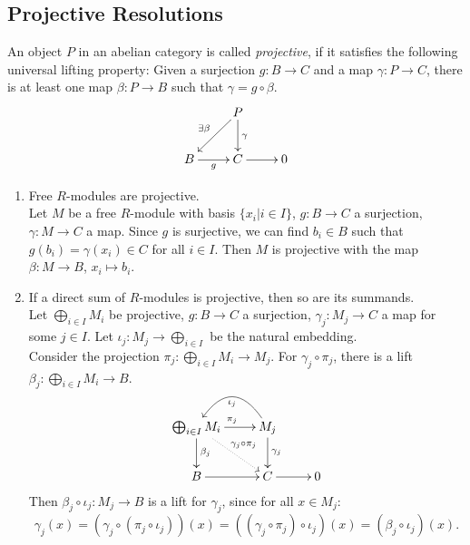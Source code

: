\subsection{Projective Resolutions}

\begin{definition}
	An object $P$ in an abelian category is called \textit{projective}, if it satisfies the following universal lifting property:
	Given a surjection $g:B\rightarrow C$ and a map $\gamma:P\rightarrow C$, there is at least one map $\beta: P\rightarrow B$ such that $\gamma=g\circ\beta$.
	\begin{align*}
		\xymatrix{
			&P \ar[ld]_{\exists\beta} \ar[d]^\gamma \\
			B \ar[r]_g &C \ar[r] &0
		}
	\end{align*}
\end{definition}

\begin{remark}
	\begin{enumerate}[label=(\roman*)]
		\item Free $R$-modules are projective. \\
		Let $M$ be a free $R$-module with basis $\{x_i\vert i\in I\}$, $g:B\rightarrow C$ a surjection, $\gamma:M\rightarrow C$ a map.
		Since $g$ is surjective, we can find $b_i\in B$ such that $g(b_i)=\gamma(x_i)\in C$ for all $i \in I$.
		Then $M$ is projective with the map $\beta:M\rightarrow B$, $x_i\mapsto b_i$.\\
		\item If a direct sum of $R$-modules is projective, then so are its summands.\\
		Let $\bigoplus_{i\in I}M_i$ be projective, $g:B\rightarrow C$ a surjection, $\gamma_j:M_j \rightarrow C$ a map for some $j\in I$.
		Let $\iota_j:M_j\rightarrow \bigoplus_{i\in I}$ be the natural embedding. \\
		Consider the projection $\pi_j:\bigoplus_{i\in I}M_i\rightarrow M_j$. For $\gamma_j\circ\pi_j$, there is a lift $\beta_j:\bigoplus_{i\in I}M_i\rightarrow B$.
		\begin{align*}
			\xymatrix{
				\bigoplus_{i\in I}M_i \ar[r]^{\pi_j} \ar[d]^{\beta_j} \ar@{.>}[rd]^{\gamma_j\circ\pi_j} &M_j \ar[d]^{\gamma_j} \ar@/_2pc/[l]^{\iota_j} \\
				B \ar[r] &C \ar[r] &0
			}
		\end{align*}
		 Then $\beta_j\circ\iota_j: M_j\rightarrow B$ is a lift for $\gamma_j$, since for all $x \in M_j$:
		 $$\gamma_j(x) = (\gamma_j \circ (\pi_j \circ \iota_j))(x) = ((\gamma_j \circ \pi_j) \circ \iota_j)(x) = (\beta_j \circ \iota_j)(x).$$
	\end{enumerate}
\end{remark}

